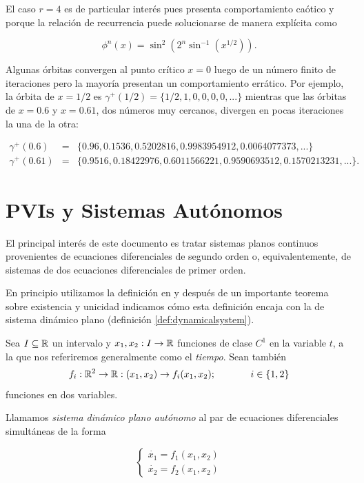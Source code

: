 \begin{example}
El caso $r = 4$ es de particular interés pues presenta comportamiento caótico \cite[p.~19]{fractallectures} y porque la relación de recurrencia puede solucionarse de manera explícita \cite{lorenz64} como

$$  \phi^n(x) = \sin^2( 2^n \sin^{-1}( x^{1/2} ) ). $$

Algunas órbitas convergen al punto crítico $x = 0$ luego de un número finito de iteraciones pero la mayoría presentan un comportamiento errático. Por ejemplo, la órbita de $x = 1/2$ es $\gamma^+(1/2) = \{ 1/2, 1, 0, 0, 0, 0, ... \}$ mientras que las órbitas de $x = 0.6$ y $x = 0.61$, dos números muy cercanos, divergen en pocas iteraciones la una de la otra:

$$
	\begin{array}{lll}
		\gamma^+(0.6) & = & \{ 0.96, 0.1536, 0.5202816, 0.9983954912, 0.0064077373, ... \} \\
	\gamma^+(0.61) & = & \{ 0.9516, 0.18422976, 0.6011566221, 0.9590693512, 0.1570213231, ... \}.
	\end{array}
$$

\end{example}

\section{PVIs y Sistemas Autónomos}
\label{sec:propiedades_generales}

El principal interés de este documento es tratar sistemas planos continuos provenientes de ecuaciones diferenciales de segundo orden o, equivalentemente, de sistemas de dos ecuaciones diferenciales de primer orden.

En principio utilizamos la definición en \cite[p.~174]{dynandbif} y después de un importante teorema sobre existencia y unicidad indicamos cómo esta definición encaja con la de sistema dinámico plano (definición \ref{def:dynamicalsystem}).

\begin{definition} \label{def:sistema_dinamico_plano}
Sea $I \subseteq {\ensuremath{\mathbb{R}}}$ un intervalo y $x_1,x_2:I \rightarrow {\ensuremath{\mathbb{R}}}$ funciones de clase $C^1$ en la variable $t$, a la que nos referiremos generalmente como el \textit{tiempo}.
Sean también $$f_i : {\mathbb{R}}^2 \rightarrow {\ensuremath{\mathbb{R}}}: (x_1, x_2) \rightarrow f_i(x_1, x_2); \hspace{0.5in} i \in \{1,2\}$$ funciones en dos variables.

Llamamos \emph{sistema dinámico plano autónomo} al par de ecuaciones diferenciales simultáneas de la forma

\begin{equation} \label{eq:sistema_dinamico_plano_v0}
\left\{
    \begin{array}{l}
        \dot{x_1} = f_1(x_1, x_2) \\
        \dot{x_2} = f_2(x_1, x_2)
    \end{array} \right.
\end{equation}
\end{definition}

